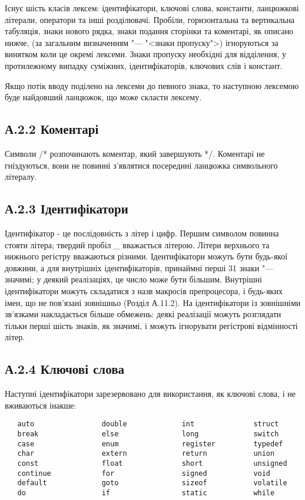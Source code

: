 \documentclass[a4paper,12pt]{book}
\begin{document}
  Існує шість класів лексем: ідентифікатори, ключові слова, константи, ланцюжкові
  літерали, оператори та інші розділювачі. Пробіли, горизонтальна та вертикальна
  табуляція, знаки нового рядка, знаки подання сторінки та коментарі, як описано нижче,
  (за загальним визначенням "--- "<знаки пропуску">) ігноруються за винятком
  коли це окремі лексеми. Знаки пропуску необхідні для відділення, у протилежному випадку
  суміжних, ідентифікаторів, ключових слів і констант.

  Якщо потік вводу поділено на лексеми до певного знака, то наступною лексемою буде
  найдовший ланцюжок, що може скласти лексему.

\subsection{А.2.2 Коментарі}


  Символи /* розпочинають коментар, який завершують */. Коментарі не гніздуються, вони
  не повинні з'являтися посередині ланцюжка символьного літералу.

\subsection{А.2.3 Ідентифікатори}


  Ідентифікатор - це послідовність з літер і цифр. Першим символом повинна стояти
  літера; твердий пробіл \_ вважається літерою. Літери верхнього та нижнього регістру
  вважаються різними. Ідентифікатори можуть бути будь-якої довжини, а для внутрішніх
  ідентифікаторів, принаймні перші 31 знаки "--- значимі; у деякий реалізаціях, це
  число може бути більшим. Внутрішні ідентифікатори можуть складатися з назв макросів
  препроцесора, і будь-яких імен, що не пов'язані зовнішньо (Розділ А.11.2). На
  ідентифікатори із зовнішніми зв'язками накладається більше обмежень: деякі
  реалізації можуть розглядати тільки перші шість знаків, як значимі, і можуть ігнорувати
  регістрові відмінності літер.

\subsection{А.2.4 Ключові слова}


  Наступні ідентифікатори зарезервовано для використання, як ключові слова, і не
  вживаються інакше:
  \begin{verbatim}
   auto                double             int              struct
   break               else               long             switch
   case                enum               register         typedef
   char                extern             return           union
   const               float              short            unsigned
   continue            for                signed           void
   default             goto               sizeof           volatile
   do                  if                 static           while
  \end{verbatim}
\end{document}
